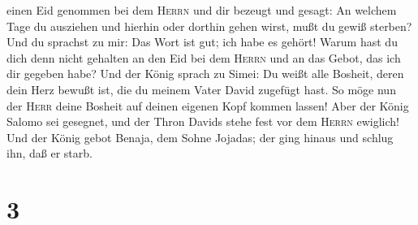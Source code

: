einen Eid genommen bei dem \textsc{Herrn} und dir bezeugt und gesagt: An
welchem Tage du ausziehen und hierhin oder dorthin gehen wirst, mußt du
gewiß sterben? Und du sprachst zu mir: Das Wort ist gut; ich habe es
gehört!  Warum hast du dich denn nicht gehalten an den
Eid bei dem \textsc{Herrn} und an das Gebot, das ich dir gegeben habe?
 Und der König sprach zu Simei: Du weißt alle Bosheit,
deren dein Herz bewußt ist, die du meinem Vater David zugefügt hast. So
möge nun der \textsc{Herr} deine Bosheit auf deinen eigenen Kopf kommen
lassen!  Aber der König Salomo sei gesegnet, und der
Thron Davids stehe fest vor dem \textsc{Herrn} ewiglich! 
Und der König gebot Benaja, dem Sohne Jojadas; der ging hinaus und
schlug ihn, daß er starb.

\hypertarget{section-2}{%
\section{3}\label{section-2}}

